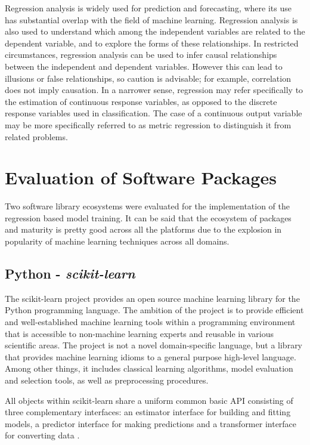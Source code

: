 \documentclass[letterpaper,12pt,titlepage,oneside,final]{report}
\begin{document}
        Regression analysis is widely used for prediction and forecasting, where its use has substantial overlap with the field of machine learning. Regression analysis is also used to understand which among the independent variables are related to the dependent variable, and to explore the forms of these relationships. In restricted circumstances, regression analysis can be used to infer causal relationships between the independent and dependent variables. However this can lead to illusions or false relationships, so caution is advisable; for example, correlation does not imply causation. In a narrower sense, regression may refer specifically to the estimation of continuous response variables, as opposed to the discrete response variables used in classification. The case of a continuous output variable may be more specifically referred to as metric regression to distinguish it from related problems.
        \clearpage
        
    \section {Evaluation of Software Packages}
        Two software library ecosystems were evaluated for the implementation of the regression based model training. It can be said that the ecosystem of packages and maturity is pretty good across all the platforms due to the explosion in popularity of machine learning techniques across all domains.
        \subsection {Python - \textit{scikit-learn}}
            The scikit-learn project provides an open source machine learning library for the Python programming language. The ambition of the project is to provide efficient and well-established machine learning tools within a programming environment that is accessible to non-machine learning experts and reusable in various scientific areas. The project is not a novel domain-specific language, but a library that provides machine learning idioms to a general purpose high-level language. Among other things, it includes classical learning algorithms, model evaluation and selection tools, as well as preprocessing procedures.

            All objects within scikit-learn share a uniform common basic API consisting of three complementary interfaces: an estimator interface for building and fitting models, a predictor interface for making predictions and a transformer interface for converting data \cite{scikit-learn}.
\end{document}
